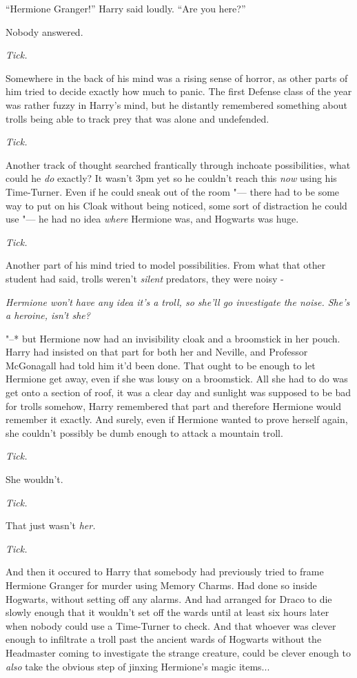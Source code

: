 ``Hermione Granger!'' Harry said loudly. ``Are you here?''

Nobody answered.

\emph{Tick.}

Somewhere in the back of his mind was a rising sense of horror, as other
parts of him tried to decide exactly how much to panic. The first
Defense class of the year was rather fuzzy in Harry's mind, but he
distantly remembered something about trolls being able to track prey
that was alone and undefended.

\emph{Tick.}

Another track of thought searched frantically through inchoate
possibilities, what could he \emph{do} exactly? It wasn't 3pm yet so he
couldn't reach this \emph{now} using his Time-Turner. Even if he could
sneak out of the room "--- there had to be some way to put on his Cloak
without being noticed, some sort of distraction he could use "--- he had no
idea \emph{where} Hermione was, and Hogwarts was huge.

\emph{Tick.}

Another part of his mind tried to model possibilities. From what that
other student had said, trolls weren't \emph{silent} predators, they
were noisy -

\emph{Hermione won't have any idea it's a troll, so she'll go
investigate the noise. She's a heroine, isn't she?}

"--* but Hermione now had an invisibility cloak and a broomstick in her
pouch. Harry had insisted on that part for both her and Neville, and
Professor McGonagall had told him it'd been done. That ought to be
enough to let Hermione get away, even if she was lousy on a broomstick.
All she had to do was get onto a section of roof, it was a clear day and
sunlight was supposed to be bad for trolls somehow, Harry remembered
that part and therefore Hermione would remember it exactly. And surely,
even if Hermione wanted to prove herself again, she couldn't possibly be
dumb enough to attack a mountain troll.

\emph{Tick.}

She wouldn't.

\emph{Tick.}

That just wasn't \emph{her.}

\emph{Tick.}

And then it occured to Harry that somebody had previously tried to frame
Hermione Granger for murder using Memory Charms. Had done so inside
Hogwarts, without setting off any alarms. And had arranged for Draco to
die slowly enough that it wouldn't set off the wards until at least six
hours later when nobody could use a Time-Turner to check. And that
whoever was clever enough to infiltrate a troll past the ancient wards
of Hogwarts without the Headmaster coming to investigate the strange
creature, could be clever enough to \emph{also} take the obvious step of
jinxing Hermione's magic items...

